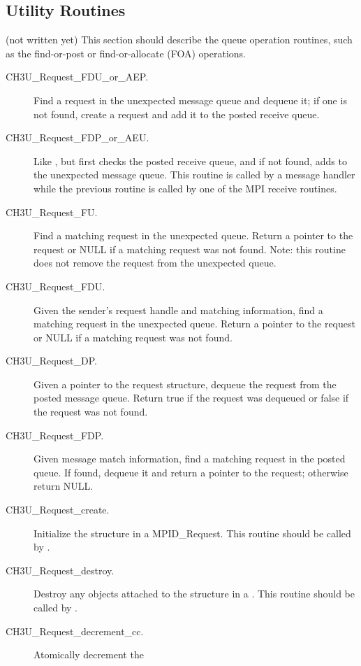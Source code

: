 \documentclass{article}
\begin{document}

\subsection{Utility Routines}
(not written yet)
This section should describe the queue operation routines, such as the
find-or-post or find-or-allocate (FOA) operations.



\begin{description}
\item[CH3U\_Request\_FDU\_or\_AEP.]Find a request in the unexpected
message queue and dequeue it; if one is not found, create a request
and add it to the posted receive queue.
\item[CH3U\_Request\_FDP\_or\_AEU.]Like ,
but first checks the posted receive queue, and if not found, adds to
the unexpected message queue.  This routine is called by a message
handler while the previous routine is called by one of the MPI receive
routines.  
\item[CH3U\_Request\_FU.]Find a matching request in the unexpected
queue.  Return a pointer to the request or NULL if a matching request
was not found.  Note: this routine does not remove the request from
the unexpected queue.
\item[CH3U\_Request\_FDU.]Given the sender's request handle and
matching information, find a matching request in the unexpected queue.
Return a pointer to the request or NULL if a matching request was not
found.
\item[CH3U\_Request\_DP.]Given a pointer to the request structure,
dequeue the request from the posted message queue.  Return true if the
request was dequeued or false if the request was not found.
\item[CH3U\_Request\_FDP.]Given message match information, find a
matching request in the posted queue.  If found, dequeue it and return
a pointer to the request; otherwise return NULL.
\item[CH3U\_Request\_create.]Initialize the  structure in a
MPID\_Request.  This routine should be called by
.
\item[CH3U\_Request\_destroy.]Destroy any objects attached to the
 structure in a .  This routine should be
called by .
\item[CH3U\_Request\_decrement\_cc.]Atomically decrement the

\end{description}
\end{document}
